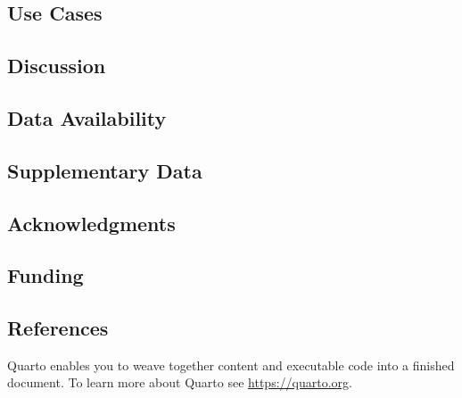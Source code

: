 \documentclass[
]{article}
\begin{document}
\hypertarget{use-cases}{%
\subsection{Use Cases}\label{use-cases}}

\hypertarget{discussion}{%
\subsection{Discussion}\label{discussion}}

\hypertarget{data-availability}{%
\subsection{Data Availability}\label{data-availability}}

\hypertarget{supplementary-data}{%
\subsection{Supplementary Data}\label{supplementary-data}}

\hypertarget{acknowledgments}{%
\subsection{Acknowledgments}\label{acknowledgments}}

\hypertarget{funding}{%
\subsection{Funding}\label{funding}}

\hypertarget{references}{%
\subsection{References}\label{references}}

Quarto enables you to weave together content and executable code into a
finished document. To learn more about Quarto see
\url{https://quarto.org}.
\end{document}

